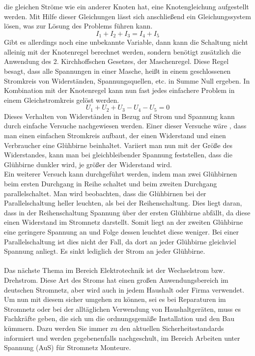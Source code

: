 die gleichen Ströme wie ein anderer Knoten hat, eine Knotengleichung aufgestellt werden. Mit Hilfe dieser Gleichungen lässt sich anschließend ein 
Gleichungssystem lösen, was zur Lösung des Problems führen kann.
\begin{equation}
I_1+I_2+I_3=I_4+I_5
\label{eqn:1. Kirchhoffsches Gesetz}
\end{equation}
Gibt es allerdings noch eine unbekannte Variable, dann kann die Schaltung nicht alleinig mit der Knotenregel berechnet werden, sondern benötigt zusätzlich die 
Anwendung des 2. Kirchhoffschen Gesetzes, der Maschenregel. Diese Regel besagt, dass alle Spannungen in einer Masche, heißt in einem geschlossenen Stromkreis 
von Widerständen, Spannungsquellen, etc. in Summe Null ergeben. In Kombination mit der Knotenregel kann nun fast jedes einfachere Problem in einem 
Gleichstromkreis gelöst werden.
\begin{equation}
U_1+U_2+U_3-U_4-U_5=0
\label{eqn:2. Kirchhoffsches Gesetz}
\end{equation}
Dieses Verhalten von Widerständen in Bezug auf Strom und Spannung kann durch einfache Versuche nachgewiesen werden. Einer dieser Versuche wäre \zB, dass 
man einen einfachen Stromkreis aufbaut, der einen Widerstand und einen Verbraucher \zB eine Glühbirne beinhaltet. Variiert man nun mit der Größe des 
Widerstandes, kann man bei gleichbleibender Spannung feststellen, dass die Glühbirne dunkler wird, je größer der Widerstand wird.\\ 
Ein weiterer Versuch kann durchgeführt werden, indem man zwei Glühbirnen beim ersten Durchgang in Reihe schaltet und beim zweiten Durchgang 
parallelschaltet. Man wird beobachten, dass die Glühbirnen bei der Parallelschaltung heller leuchten, als bei der Reihenschaltung. Dies liegt daran, 
dass in der Reihenschaltung Spannung über der ersten Glühbirne abfällt, da diese einen Widerstand im Stromnetz darstellt. Somit liegt an der zweiten 
Glühbirne eine geringere Spannung an und Folge dessen leuchtet diese weniger. Bei einer Parallelschaltung ist dies nicht der Fall, da dort an jeder 
Glühbirne gleichviel Spannung anliegt. Es sinkt lediglich der Strom an jeder Glühbirne.\\\\ %
Das nächste Thema im Bereich Elektrotechnik ist der Wechselstrom bzw. Drehstrom. Diese Art des Stroms hat einen großen Anwendungsbereich im deutschen 
Stromnetz, aber wird auch in jedem Haushalt oder Firma verwendet. Um nun mit diesem sicher umgehen zu können, sei es bei Reparaturen im Stromnetz oder
 bei der alltäglichen Verwendung von Haushaltgeräten, muss es Fachkräfte geben, die sich um die ordnungsgemäße Installation und den Bau kümmern. 
 Dazu werden Sie immer zu den aktuellen Sicherheitsstandards informiert und werden gegebenenfalls nachgeschult, \zB im Bereich Arbeiten unter Spannung (AuS) 
 für Stromnetz Monteure.
